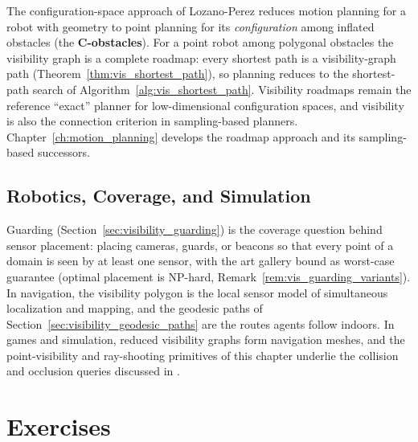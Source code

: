 The configuration-space approach of Lozano-Perez \cite{lozanoperez1983}
reduces motion planning for a robot with geometry to point planning for its
\emph{configuration} among inflated obstacles (the \textbf{C-obstacles}).
For a point robot among polygonal obstacles the visibility graph is a
complete roadmap: every shortest path is a visibility-graph path
(Theorem~\ref{thm:vis_shortest_path}), so planning reduces to the
shortest-path search of Algorithm~\ref{alg:vis_shortest_path}. Visibility
roadmaps remain the reference ``exact'' planner for low-dimensional
configuration spaces, and visibility is also the connection criterion in
sampling-based planners. Chapter~\ref{ch:motion_planning} develops the
roadmap approach and its sampling-based successors.

\subsection*{Robotics, Coverage, and Simulation}

Guarding (Section~\ref{sec:visibility_guarding}) is the coverage question
behind sensor placement: placing cameras, guards, or beacons so that every
point of a domain is seen by at least one sensor, with the art gallery
bound as worst-case guarantee (optimal placement is NP-hard,
Remark~\ref{rem:vis_guarding_variants}). In navigation, the visibility
polygon is the local sensor model of simultaneous localization and mapping,
and the geodesic paths of Section~\ref{sec:visibility_geodesic_paths} are
the routes agents follow indoors. In games and simulation, reduced
visibility graphs form navigation meshes, and the point-visibility and
ray-shooting primitives of this chapter underlie the collision and occlusion
queries discussed in \cite{ericson2004}.


\section{Exercises}
\label{sec:visibility_exercises}

